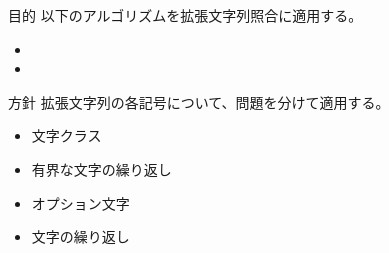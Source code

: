 \documentclass[dvipdfmx,12pt,beamer]{standalone}
\begin{document}
\begin{frame}{目的}
	以下のアルゴリズムを拡張文字列照合に適用する。
	\begin{itemize}
		\item \ShiftAnd
		\item \BNDM
	\end{itemize}

	\begin{block}{方針}
		拡張文字列の各記号について、問題を分けて適用する。
		\begin{itemize}
			\item 文字クラス
			\item 有界な文字の繰り返し
			\item オプション文字
			\item 文字の繰り返し
		\end{itemize}
	\end{block}

\end{frame}
\end{document}
